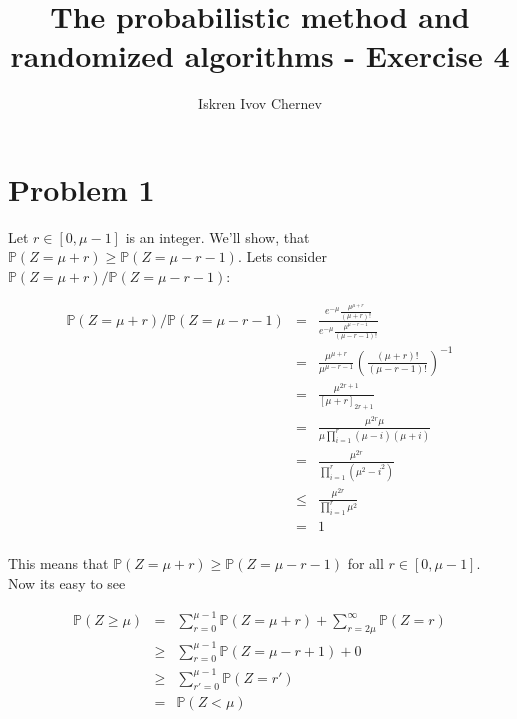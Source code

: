\documentclass[a4paper]{article}
\begin{document}
\title{The probabilistic method and randomized algorithms - Exercise 4}
\author{Iskren Ivov Chernev}
\maketitle

\def\sm{\mathrm{sm}}
\def\P{\mathbb{P}}
\def\E{\mathbb{E}}
\def\irv{i.r.v.\;}
\def\rv{r.v.\;}
\def\FMM{F.M.M.\;}
\def\endproof{$\square$}
\def\Var{\mathrm{Var}}
\def\Cov{\mathrm{Cov}}
\def\CS{\mathrm{CS}}
\def\CCS{\mathrm{CCS}}
\def\Dom{\mathrm{Dom}}
\def\Im{\mathrm{Im}}
\newcommand{\bfrac}[2] {\left(\frac{#1}{#2}\right)}
\newcommand{\B}[1] {\left(#1\right)}

\section*{Problem 1}

Let $ r \in [0, \mu - 1] $ is an integer. We'll show, that $ \P(Z = \mu + r) \ge
\P(Z = \mu - r - 1) $. Lets consider $ \P(Z = \mu + r) / \P(Z = \mu - r - 1) $:

\begin{eqnarray*}
\P(Z = \mu + r) / \P(Z = \mu - r - 1)
  &=& \frac{e^{-\mu} \frac{\mu^{\mu + r}}{(\mu + r)!}}{e^{-\mu} \frac{\mu^{\mu - r -1}}{(\mu - r - 1)!}} \\
  &=& \frac{\mu^{\mu+r}}{\mu^{\mu - r - 1}} \B{\frac{(\mu + r)!}{(\mu - r - 1)!}}^{-1} \\
  &=& \frac{\mu^{2r+1}}{[\mu + r]_{2r+1}} \\
  &=& \frac{\mu^{2r} \mu}{\mu \prod_{i=1}^{r} (\mu - i)(\mu + i)} \\
  &=& \frac{\mu^{2r}} {\prod_{i=1}^{r} (\mu^2 - i^2)} \\
  &\le& \frac{\mu^{2r}} {\prod_{i=1}^{r} \mu^2} \\
  &=& 1 \\
\end{eqnarray*}

This means that $ \P(Z = \mu + r) \ge \P(Z = \mu - r - 1) $ for all $ r \in [0,
\mu - 1] $. Now its easy to see

\begin{eqnarray*}
\P(Z \ge \mu)
  &=& \sum_{r = 0}^{\mu - 1} \P(Z = \mu + r) + \sum_{r = 2\mu}^{\infty} \P(Z = r) \\
  &\ge& \sum_{r = 0}^{\mu - 1} \P(Z = \mu - r + 1) + 0 \\
  &\ge& \sum_{r' = 0}^{\mu - 1} \P(Z = r') \\
  &=& \P(Z < \mu)
\end{eqnarray*}
\end{document}
